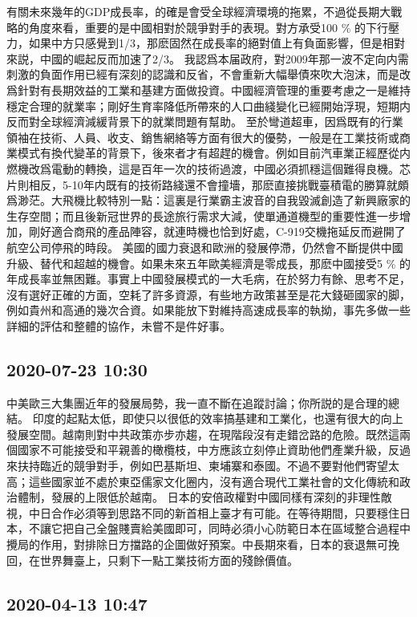\documentclass[twocolumn]{ctexart}
\begin{document}
有關未來幾年的GDP成長率，的確是會受全球經濟環境的拖累，不過從長期大戰略的角度來看，重要的是中國相對於競爭對手的表現。對方承受100 \% 的下行壓力，如果中方只感覺到1/3，那麽固然在成長率的絕對值上有負面影響，但是相對來説，中國的崛起反而加速了2/3。
我認爲本届政府，對2009年那一波不定向内需刺激的負面作用已經有深刻的認識和反省，不會重新大幅舉債來吹大泡沫，而是改爲針對有長期效益的工業和基建方面做投資。中國經濟管理的重要考慮之一是維持穩定合理的就業率；剛好生育率降低所帶來的人口曲綫變化已經開始浮現，短期内反而對全球經濟減緩背景下的就業問題有幫助。
至於彎道超車，因爲既有的行業領袖在技術、人員、收支、銷售網絡等方面有很大的優勢，一般是在工業技術或商業模式有換代變革的背景下，後來者才有超趕的機會。例如目前汽車業正經歷從内燃機改爲電動的轉換，這是百年一次的技術過渡，中國必須抓穩這個難得良機。芯片則相反，5-10年内既有的技術路綫還不會撞墻，那麽直接挑戰臺積電的勝算就頗爲渺茫。大飛機比較特別一點：這裏是行業霸主波音的自我毀滅創造了新興廠家的生存空間；而且後新冠世界的長途旅行需求大減，使單通道機型的重要性進一步增加，剛好適合商飛的產品陣容，就連時機也恰到好處，C-919交機拖延反而避開了航空公司停飛的時段。
美國的國力衰退和歐洲的發展停滯，仍然會不斷提供中國升級、替代和超越的機會。如果未來五年歐美經濟是零成長，那麽中國接受5 \% 的年成長率並無困難。事實上中國發展模式的一大毛病，在於努力有餘、思考不足，沒有選好正確的方面，空耗了許多資源，有些地方政策甚至是花大錢砸國家的脚，例如貴州和高通的幾次合資。如果能放下對維持高速成長率的執拗，事先多做一些詳細的評估和整體的協作，未嘗不是件好事。
\subsection*{2020-07-23 10:30}

中美歐三大集團近年的發展局勢，我一直不斷在追蹤討論；你所説的是合理的總結。
印度的起點太低，即使只以很低的效率搞基建和工業化，也還有很大的向上發展空間。越南則對中共政策亦步亦趨，在現階段沒有走錯岔路的危險。既然這兩個國家不可能接受和平親善的橄欖枝，中方應該立刻停止資助他們產業升級，反過來扶持臨近的競爭對手，例如巴基斯坦、柬埔寨和泰國。不過不要對他們寄望太高；這些國家並不處於東亞儒家文化圈内，沒有適合現代工業社會的文化傳統和政治體制，發展的上限低於越南。
日本的安倍政權對中國同樣有深刻的非理性敵視，中日合作必須等到思路不同的新首相上臺才有可能。在等待期間，只要穩住日本，不讓它把自己全盤賤賣給美國即可，同時必須小心防範日本在區域整合過程中攪局的作用，對排除日方擋路的企圖做好預案。中長期來看，日本的衰退無可挽回，在世界舞臺上，只剩下一點工業技術方面的殘餘價值。
\subsection*{2020-04-13 10:47}
\end{document}
